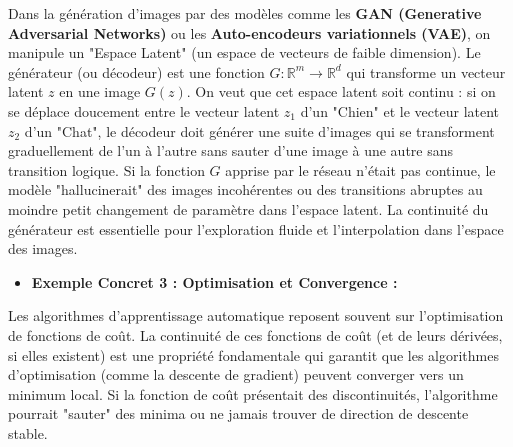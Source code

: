 \documentclass[12pt,a4paper]{report}
\begin{document}
    Dans la génération d'images par des modèles comme les \textbf{GAN (Generative Adversarial Networks)} ou les \textbf{Auto-encodeurs variationnels (VAE)}, on manipule un "Espace Latent" (un espace de vecteurs de faible dimension). Le générateur (ou décodeur) est une fonction $G: \mathbb{R}^m \to \mathbb{R}^d$ qui transforme un vecteur latent $z$ en une image $G(z)$. On veut que cet espace latent soit continu : si on se déplace doucement entre le vecteur latent $z_1$ d'un "Chien" et le vecteur latent $z_2$ d'un "Chat", le décodeur doit générer une suite d'images qui se transforment graduellement de l'un à l'autre sans sauter d'une image à une autre sans transition logique. Si la fonction $G$ apprise par le réseau n'était pas continue, le modèle "hallucinerait" des images incohérentes ou des transitions abruptes au moindre petit changement de paramètre dans l'espace latent. La continuité du générateur est essentielle pour l'exploration fluide et l'interpolation dans l'espace des images.
\begin{itemize}
\item \textbf{Exemple Concret 3 : Optimisation et Convergence :}
\end{itemize}
    Les algorithmes d'apprentissage automatique reposent souvent sur l'optimisation de fonctions de coût. La continuité de ces fonctions de coût (et de leurs dérivées, si elles existent) est une propriété fondamentale qui garantit que les algorithmes d'optimisation (comme la descente de gradient) peuvent converger vers un minimum local. Si la fonction de coût présentait des discontinuités, l'algorithme pourrait "sauter" des minima ou ne jamais trouver de direction de descente stable.
\end{document}
